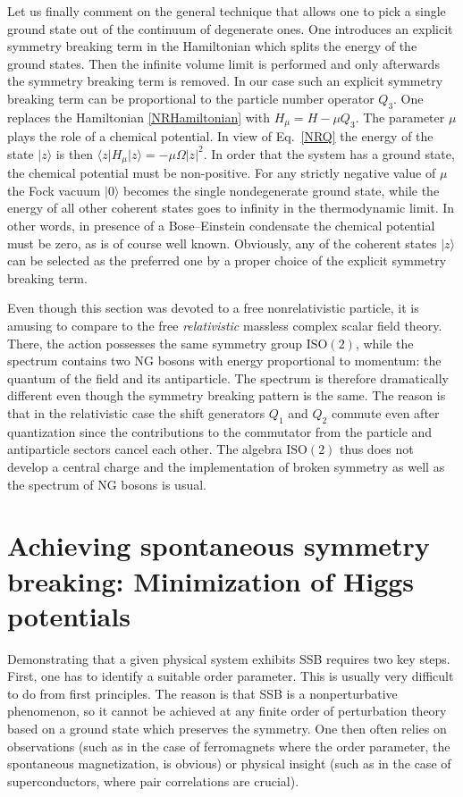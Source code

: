 \documentclass[final,2p,times,12pt,sort&compress]{elsarticle}
\newcommand\gr[1]{\mathrm{#1}}              %
\newcommand\bra[1]{\langle#1\vert}          %
\newcommand\ket[1]{\vert#1\rangle}          %
\newcommand\abs[1]{\left|#1\right|}         %
\begin{document}
Let us finally comment on the general technique that allows one to pick a
single ground state out of the continuum of degenerate ones. One introduces an
explicit symmetry breaking term in the Hamiltonian which splits the energy of
the ground states. Then the infinite volume limit is performed and only
afterwards the symmetry breaking term is removed. In our case such an explicit
symmetry breaking term can be proportional to the particle number operator
$Q_3$. One replaces the Hamiltonian \eqref{NRHamiltonian} with $H_\mu=H-\mu
Q_3$. The parameter $\mu$ plays the role of a chemical potential. In view of
Eq.~\eqref{NRQ} the energy of the state $\ket z$ is then $\bra zH_\mu\ket
z=-\mu\Omega\abs z^2$. In order that the system has a ground state, the
chemical potential must be non-positive. For any strictly negative value of
$\mu$ the Fock vacuum $\ket0$ becomes the single nondegenerate ground state,
while the energy of all other coherent states goes to infinity in the
thermodynamic limit. In other words, in presence of a Bose--Einstein condensate
the chemical potential must be zero, as is of course well known. Obviously, any
of the coherent states $\ket z$ can be selected as the preferred one by a proper
choice of the explicit symmetry breaking term.

Even though this section was devoted to a free nonrelativistic particle, it is
amusing to compare to the free \emph{relativistic} massless complex scalar
field theory. There, the action possesses the same symmetry group
$\gr{ISO(2)}$, while the spectrum contains two NG bosons with energy
proportional to momentum: the quantum of the field and its antiparticle. The
spectrum is therefore dramatically different even though the symmetry breaking
pattern is the same. The reason is that in the relativistic case the shift
generators $Q_1$ and $Q_2$ commute even after quantization since the
contributions to the commutator from the particle and antiparticle sectors
cancel each other. The algebra $\gr{ISO(2)}$ thus does not develop a
central charge and the implementation of broken symmetry as well as the
spectrum of NG bosons is usual.


\section{Achieving spontaneous symmetry breaking: Minimization of Higgs
potentials}
\label{sec:higgs}
Demonstrating that a given physical system exhibits SSB requires two
key steps. First, one has to identify a suitable order parameter. This is
usually very difficult to do from first principles. The reason is that SSB is a
nonperturbative phenomenon, so it cannot be achieved at any finite order of
perturbation theory based on a ground state which preserves the symmetry. One
then often relies on observations (such as in the case of ferromagnets
where the order parameter, the spontaneous magnetization, is obvious) or
physical insight (such as in the case of superconductors, where pair
correlations are crucial).
\end{document}
